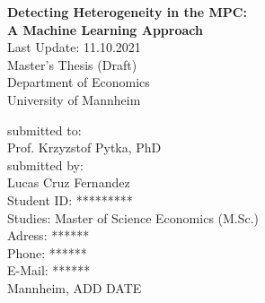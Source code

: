 \begin{titlepage}

\begin{center}

\vspace*{1,2cm}

\huge {\bfseries Detecting Heterogeneity in the MPC: \\ A Machine Learning Approach}\\[1.8cm]
\Large {Last Update: 11.10.2021}\\[1cm]

\Large {Master's Thesis (Draft)}\\[1cm]
\large {Department of Economics}\\[0.2cm]

\large {University of Mannheim}\\[0.5cm]

\end{center}

\vfill

\noindent submitted to:\\
Prof. Krzyzstof Pytka, PhD\\[1cm]
submitted by:\\
Lucas Cruz Fernandez\\[1cm]
Student ID: *********\\
Studies: Master of Science Economics (M.Sc.)\\[1cm]
Adress: ****** \\
Phone: ****** \\
E-Mail: ****** \\[1cm]
Mannheim, ADD DATE

\setcounter{page}{0}

\end{titlepage}
